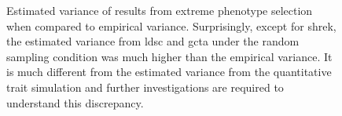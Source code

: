 \begin{figure}
{				
				\label{fig:ldscInExVarCom}
			}
			\caption[Estimation of Variance in Extreme Phenotype Selection]
			{Estimated variance of results from extreme phenotype selection when compared to empirical variance.
				Surprisingly, except for \gls{shrek}, the estimated variance from \gls{ldsc} and \gls{gcta} under the random sampling condition was much higher than the empirical variance. 
				It is much different from the estimated variance from the quantitative trait simulation and further investigations are required to understand this discrepancy.
				} 
			\label{fig:ExVarCom}
		\end{figure}